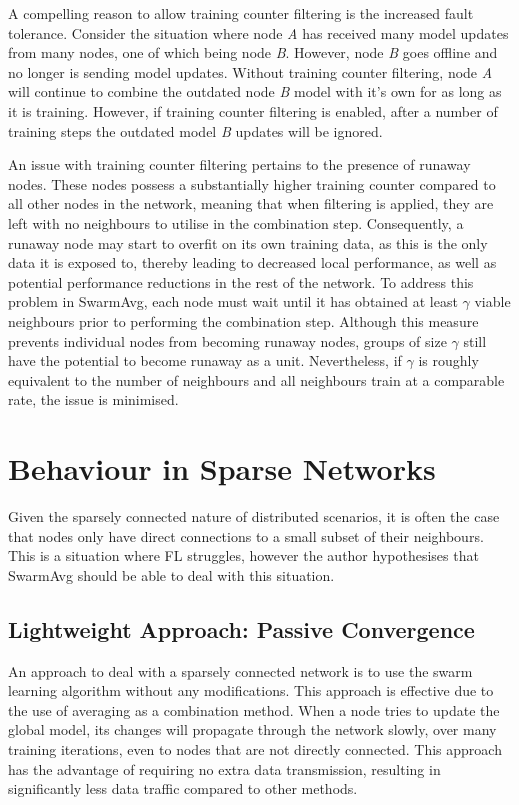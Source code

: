 A compelling reason to allow training counter filtering is the increased fault tolerance. Consider the situation where node \emph{A} has received many model updates from many nodes, one of which being node \emph{B}. However, node \emph{B} goes offline and no longer is sending model updates. Without training counter filtering, node \emph{A} will continue to combine the outdated node \emph{B} model with it's own for as long as it is training. However, if training counter filtering is enabled, after a number of training steps the outdated model \emph{B} updates will be ignored.

An issue with training counter filtering pertains to the presence of runaway nodes. These nodes possess a substantially higher training counter compared to all other nodes in the network, meaning that when filtering is applied, they are left with no neighbours to utilise in the combination step. Consequently, a runaway node may start to overfit on its own training data, as this is the only data it is exposed to, thereby leading to decreased local performance, as well as potential performance reductions in the rest of the network. To address this problem in SwarmAvg, each node must wait until it has obtained at least $\gamma$ viable neighbours prior to performing the combination step. Although this measure prevents individual nodes from becoming runaway nodes, groups of size $\gamma$ still have the potential to become runaway as a unit. Nevertheless, if $\gamma$ is roughly equivalent to the number of neighbours and all neighbours train at a comparable rate, the issue is minimised.

\section{Behaviour in Sparse Networks}
Given the sparsely connected nature of distributed scenarios, it is often the case that nodes only have direct connections to a small subset of their neighbours. This is a situation where FL struggles, however the author hypothesises that SwarmAvg should be able to deal with this situation.

\subsection{Lightweight Approach: Passive Convergence}
An approach to deal with a sparsely connected network is to use the swarm learning algorithm without any modifications. This approach is effective due to the use of averaging as a combination method. When a node tries to update the global model, its changes will propagate through the network slowly, over many training iterations, even to nodes that are not directly connected. This approach has the advantage of requiring no extra data transmission, resulting in significantly less data traffic compared to other methods.


